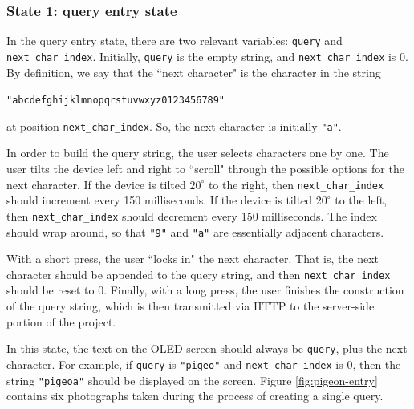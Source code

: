 \documentclass[12pt]{article}
\begin{document}
\subsubsection{State 1: query entry state}
In the query entry state, there are two relevant variables: \texttt{query} and \texttt{next_char_index}.  Initially, \texttt{query} is the empty string, and \texttt{next_char_index} is 0.  By definition, we say that the ``next character" is the character in the string

\begin{centering}
\texttt{"abcdefghijklmnopqrstuvwxyz0123456789"}\\
\end{centering}
\noindent at position \texttt{next_char_index}.  So, the next character is initially \texttt{"a"}.

In order to build the query string, the user selects characters one by one.  The user tilts the device left and right to ``scroll" through the possible options for the next character.  If the device is tilted $20^{\circ}$ to the right, then \texttt{next_char_index} should increment every 150 milliseconds.  If the device is tilted $20^{\circ}$ to the left, then \texttt{next_char_index} should decrement every 150 milliseconds.  The index should wrap around, so that \texttt{"9"} and \texttt{"a"} are essentially adjacent characters.

With a short press, the user ``locks in" the next character.  That is, the next character should be appended to the query string, and then \texttt{next_char_index} should be reset to 0.  Finally, with a long press, the user finishes the construction of the query string, which is then transmitted via HTTP to the server-side portion of the project.

In this state, the text on the OLED screen should always be \texttt{query}, plus the next character.  For example, if \texttt{query} is \texttt{"pigeo"} and \texttt{next_char_index} is 0, then the string \texttt{"pigeoa"} should be displayed on the screen.  Figure \ref{fig:pigeon-entry} contains six photographs taken during the process of creating a single query.
\end{document}

